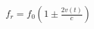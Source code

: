 \documentclass[preview]{standalone}
\begin{document}
\begin{align*}
f_r = f_0 \left(1 \pm \frac{2v(t)}{c}\right)
\end{align*}
\end{document}
